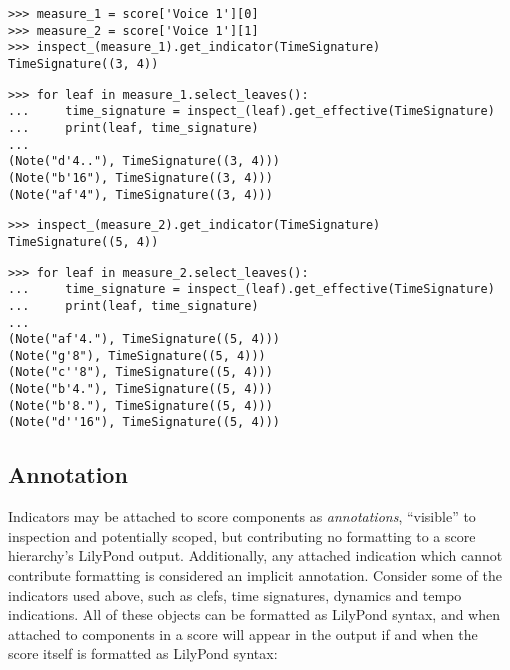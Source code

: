\begin{abjadbookoutput}
\begin{singlespacing}
\vspace{-0.5\baselineskip}
\begin{lstlisting}
>>> measure_1 = score['Voice 1'][0]
>>> measure_2 = score['Voice 1'][1]
>>> inspect_(measure_1).get_indicator(TimeSignature)
TimeSignature((3, 4))
\end{lstlisting}
\begin{lstlisting}
>>> for leaf in measure_1.select_leaves():
...     time_signature = inspect_(leaf).get_effective(TimeSignature)
...     print(leaf, time_signature)
...
(Note("d'4.."), TimeSignature((3, 4)))
(Note("b'16"), TimeSignature((3, 4)))
(Note("af'4"), TimeSignature((3, 4)))
\end{lstlisting}
\begin{lstlisting}
>>> inspect_(measure_2).get_indicator(TimeSignature)
TimeSignature((5, 4))
\end{lstlisting}
\begin{lstlisting}
>>> for leaf in measure_2.select_leaves():
...     time_signature = inspect_(leaf).get_effective(TimeSignature)
...     print(leaf, time_signature)
...
(Note("af'4."), TimeSignature((5, 4)))
(Note("g'8"), TimeSignature((5, 4)))
(Note("c''8"), TimeSignature((5, 4)))
(Note("b'4."), TimeSignature((5, 4)))
(Note("b'8."), TimeSignature((5, 4)))
(Note("d''16"), TimeSignature((5, 4)))
\end{lstlisting}
\end{singlespacing}
\end{abjadbookoutput}

\subsection{Annotation}

Indicators may be attached to score components as \emph{annotations},
\enquote{visible} to inspection and potentially scoped, but contributing no
formatting to a score hierarchy's LilyPond output. Additionally, any attached
indication which cannot contribute formatting is considered an implicit
annotation. Consider some of the indicators used above, such as clefs, time
signatures, dynamics and tempo indications. All of these objects can be
formatted as LilyPond syntax, and when attached to components in a score will
appear in the output if and when the score itself is formatted as LilyPond
syntax:

\begin{comment}
<abjad>
clef = Clef('bass')
print(format(clef, 'lilypond'))
time_signature = TimeSignature((5, 4))
print(format(time_signature, 'lilypond'))
dynamic = Dynamic('p')
print(format(dynamic, 'lilypond'))
tempo = Tempo((1, 4), 88)
print(format(tempo, 'lilypond'))
</abjad>
\end{comment}

